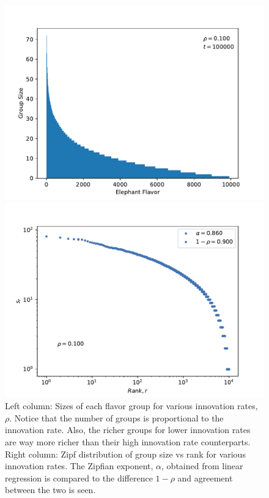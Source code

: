 \documentclass{article}
\begin{document}
\begin{figure}[H]
    \begin{minipage}{0.47\textwidth}
    \includegraphics[width=\linewidth]{Q01/richGetRicherBarChart_rho0d100.pdf}
    \end{minipage}
    \hspace{\fill} %
    \begin{minipage}{0.47\textwidth}
    \includegraphics[width=\linewidth]{Q01/rgr_zipf_rho0d100}
    \end{minipage}
    
\caption{Left column: Sizes of each flavor group for various innovation rates, $\rho$. Notice that the number of groups is proportional to the innovation rate. Also, the richer groups for lower innovation rates are way more richer than their high innovation rate counterparts. Right column: Zipf distribution of group size vs rank for various innovation rates. The Zipfian exponent, $\alpha$, obtained from linear regression is compared to the difference $1-\rho$ and agreement between the two is seen.} \label{fig:4pics}
\end{figure}
\end{document}
